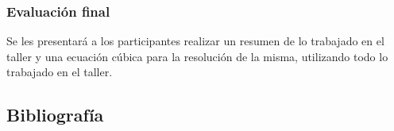 \subsubsection{Evaluación final}

Se les presentará a los participantes realizar un resumen de lo trabajado en el taller y una ecuación cúbica para la resolución de la misma, utilizando todo lo trabajado en el taller.

\subsection{Bibliografía}

\nocite{*}
\printbibliography[keyword={04}]